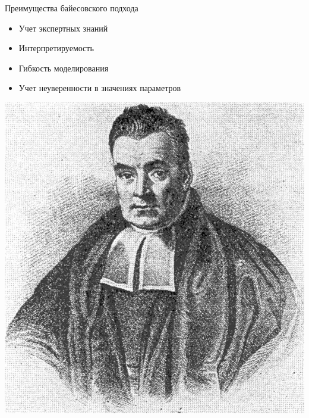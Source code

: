 \documentclass[12pt]{beamer}
\begin{document}
\begin{frame}{Преимущества байесовского подхода}
\begin{minipage}{0.6\linewidth}
	\begin{itemize}
		\item Учет экспертных знаний
		\item Интерпретируемость
		\item Гибкость моделирования
		\item Учет неуверенности в значениях параметров
	\end{itemize}
\end{minipage}
\begin{minipage}{0.38\linewidth}
	\includegraphics[width=\linewidth]{bayes}
\end{minipage}
\end{frame}
\end{document}
